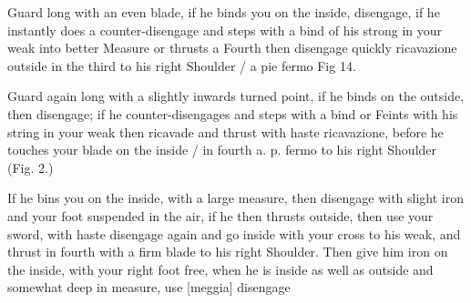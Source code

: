 Guard long with an even blade, if he binds you on the inside,
disengage, if he instantly does a counter-disengage and steps with a
bind of his strong in your weak into better Measure or thrusts a
Fourth then disengage quickly ricavazione outside in the third to his
right Shoulder / a pie fermo Fig 14.


\exercise{}
Guard again long with a slightly inwards turned point, if he binds on
the outside, then disengage; if he counter-disengages and steps with a
bind or Feints with his string in your weak then ricavade and thrust
with haste ricavazione, before he touches your blade on the inside /
in fourth a. p. fermo to his right Shoulder (Fig. 2.)

\exercise{}
If he bins you on the inside, with a large measure, then disengage
with slight iron and your foot suspended in the air, if he then
thrusts outside, then use your sword, with haste disengage again and
go inside with your cross to his weak, and thrust in fourth with a
firm blade to his right Shoulder. Then give him iron on the inside,
with your right foot free, when he is inside as well as outside and
somewhat deep in measure, use [meggia] disengage

